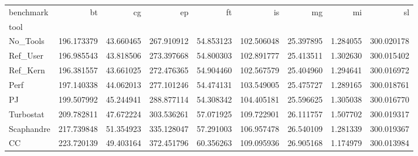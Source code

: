 \begin{tabular}{lrrrrrrrr}
\toprule
benchmark & bt & cg & ep & ft & is & mg & mi & sl \\
tool &  &  &  &  &  &  &  &  \\
\midrule
No_Tools & 196.173379 & 43.660465 & 267.910912 & 54.853123 & 102.506048 & 25.397895 & 1.284055 & 300.020178 \\
Ref_User & 196.985543 & 43.818506 & 273.397668 & 54.800303 & 102.891777 & 25.413511 & 1.302630 & 300.015402 \\
Ref_Kern & 196.381557 & 43.661025 & 272.476365 & 54.904460 & 102.567579 & 25.404960 & 1.294641 & 300.016972 \\
Perf & 197.140338 & 44.062013 & 277.101246 & 54.474131 & 103.549005 & 25.475727 & 1.289165 & 300.018761 \\
PJ & 199.507992 & 45.244941 & 288.877114 & 54.308342 & 104.405181 & 25.596625 & 1.305038 & 300.016770 \\
Turbostat & 209.782811 & 47.672224 & 303.536261 & 57.071925 & 109.722901 & 26.111757 & 1.507702 & 300.019317 \\
Scaphandre & 217.739848 & 51.354923 & 335.128047 & 57.291003 & 106.957478 & 26.540109 & 1.281339 & 300.019367 \\
CC & 223.720139 & 49.403164 & 372.451796 & 60.356263 & 109.095936 & 26.905168 & 1.174979 & 300.013984 \\
\bottomrule
\end{tabular}
